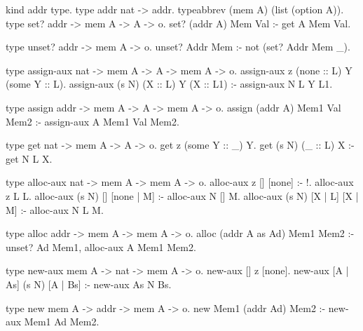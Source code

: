 \begin{elpicode}
  kind addr type.
  type addr nat -> addr.
  typeabbrev (mem A) (list (option A)).
  type set? addr -> mem A -> A -> o.
  set? (addr A) Mem Val :- get A Mem Val.

  type unset? addr -> mem A -> o.
  unset? Addr Mem :- not (set? Addr Mem _).

  type assign-aux nat -> mem A -> A -> mem A -> o.
  assign-aux z (none :: L) Y (some Y :: L).
  assign-aux (s N) (X :: L) Y (X :: L1) :- assign-aux N L Y L1.

  type assign addr -> mem A -> A -> mem A -> o.
  assign (addr A) Mem1 Val Mem2 :- assign-aux A Mem1 Val Mem2.

  type get nat -> mem A -> A -> o.
  get z (some Y :: _) Y.
  get (s N) (_ :: L) X :- get N L X.

  type alloc-aux nat -> mem A -> mem A -> o.
  alloc-aux z [] [none] :- !.
  alloc-aux z L L.
  alloc-aux (s N) [] [none | M] :- alloc-aux N [] M.
  alloc-aux (s N) [X | L] [X | M] :- alloc-aux N L M.

  type alloc addr -> mem A -> mem A -> o.
  alloc (addr A as Ad) Mem1 Mem2 :- unset? Ad Mem1, 
    alloc-aux A Mem1 Mem2.

  type new-aux mem A -> nat -> mem A -> o.
  new-aux [] z [none].
  new-aux [A | As] (s N) [A | Bs] :- new-aux As N Bs.

  type new mem A -> addr -> mem A -> o.
  new Mem1 (addr Ad) Mem2 :- new-aux Mem1 Ad Mem2.


\end{elpicode}

